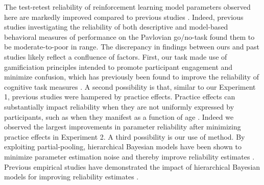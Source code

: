 \documentclass[a4paper,12pt]{article}
\begin{document}
\begin{refsection}[main]

The test-retest reliability of reinforcement learning model parameters observed here are markedly improved compared to previous studies \cite{moutoussis2018change, pike2022test}. Indeed, previous studies investigating the reliability of both descriptive and model-based behavioral measures of performance on the Pavlovian go/no-task found them to be moderate-to-poor in range. The discrepancy in findings between ours and past studies likely reflect a confluence of factors. First, our task made use of gamificiation principles intended to promote participant engagement and minimize confusion, which has previously been found to improve the reliability of cognitive task measures \cite{kucina2022solution, verdejo2021unified}. A second possibility is that, similar to our Experiment 1, previous studies were hampered by practice effects. Practice effects can substantially impact reliability when they are not uniformly expressed by participants, such as when they manifest as a function of age \cite{anokhin2022age}. Indeed we observed the largest improvements in parameter reliability after minimizing practice effects in Experiment 2. A third possibility is our use of method. By exploiting partial-pooling, hierarchical Bayesian models have been shown to minimize parameter estimation noise and thereby improve reliability estimates \cite{haines2023classical, rouder2019psychometrics}. Previous empirical studies have demonstrated the impact of hierarchical Bayesian models for improving reliability estimates \cite{brown2020improving, waltmann2022sufficient}. 


\end{refsection}
\end{document}
